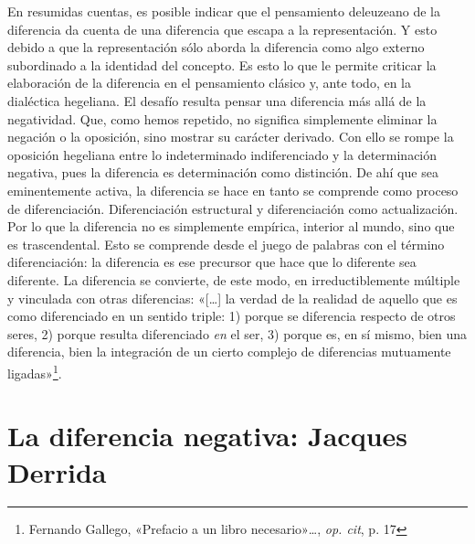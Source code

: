 En resumidas cuentas, es posible indicar que el pensamiento deleuzeano de la diferencia da cuenta de una diferencia que escapa a la representación. Y esto debido a que la representación sólo aborda la diferencia como algo externo subordinado a la identidad del concepto. Es esto lo que le permite criticar la elaboración de la diferencia en el pensamiento clásico y, ante todo, en la dialéctica hegeliana. El desafío resulta pensar una diferencia más allá de la negatividad. Que, como hemos repetido, no significa simplemente eliminar la negación o la oposición, sino mostrar su carácter derivado. Con ello se rompe la oposición hegeliana entre lo indeterminado indiferenciado y la determinación negativa, pues la diferencia es determinación como distinción. De ahí que sea eminentemente activa, la diferencia se hace en tanto se comprende como proceso de diferenciación. Diferenciación estructural y diferenciación como actualización. Por lo que la diferencia no es simplemente empírica, interior al mundo, sino que es trascendental. Esto se comprende desde el juego de palabras con el término diferenciación: la diferencia es ese precursor que hace que lo diferente sea diferente. La diferencia se convierte, de este modo, en irreductiblemente múltiple y vinculada con otras diferencias: «{[}\ldots{]} la verdad de la realidad de aquello que es como diferenciado en un sentido triple: 1) porque se diferencia respecto de otros seres, 2) porque resulta diferenciado \emph{en} el ser, 3) porque es, en sí mismo, bien una diferencia, bien la integración de un cierto complejo de diferencias mutuamente ligadas»\footnote{Fernando Gallego, «Prefacio a un libro necesario»\ldots, \emph{op. cit}, p. 17}.

\section{La diferencia negativa: Jacques Derrida}

